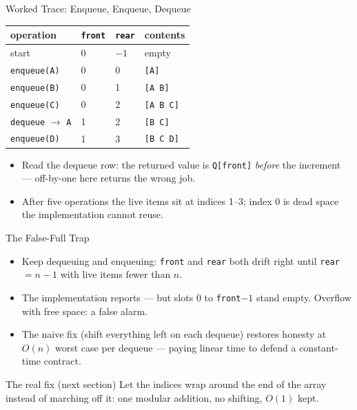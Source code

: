 \documentclass[aspectratio=169]{beamer}
\begin{document}
\begin{frame}{Worked Trace: Enqueue, Enqueue, Dequeue}
  \begin{center}
  {\small
  \begin{tabular}{llll}
    \toprule
    \textbf{operation} & \texttt{front} & \texttt{rear} & \textbf{contents} \\
    \midrule
    start & 0 & $-1$ & empty \\
    \texttt{enqueue(A)} & 0 & 0 & \texttt{[A]} \\
    \texttt{enqueue(B)} & 0 & 1 & \texttt{[A B]} \\
    \texttt{enqueue(C)} & 0 & 2 & \texttt{[A B C]} \\
    \texttt{dequeue} $\to$ \texttt{A} & 1 & 2 & \texttt{[B C]} \\
    \texttt{enqueue(D)} & 1 & 3 & \texttt{[B C D]} \\
    \bottomrule
  \end{tabular}}
  \end{center}
  \begin{itemize}
    \item Read the dequeue row: the returned value is \texttt{Q[front]}
      \emph{before} the increment --- off-by-one here returns the wrong job.
    \item After five operations the live items sit at indices 1--3; index 0
      is dead space the implementation cannot reuse.
  \end{itemize}
\end{frame}

\begin{frame}{The False-Full Trap}
  \begin{itemize}
    \item Keep dequeuing and enqueuing: \texttt{front} and \texttt{rear} both
      drift right until \texttt{rear} $= n - 1$ with live items fewer than $n$.
    \item The implementation reports  --- but slots $0$ to
      \texttt{front}$-1$ stand empty. Overflow with free space: a false
      alarm.
    \item The naive fix (shift everything left on each dequeue) restores
      honesty at $O(n)$ worst case per dequeue --- paying linear time to
      defend a constant-time contract.
  \end{itemize}
  \begin{exampleblock}{The real fix (next section)}
    Let the indices wrap around the end of the array instead of marching off
    it: one modular addition, no shifting, $O(1)$ kept.
  \end{exampleblock}
\end{frame}
\end{document}
